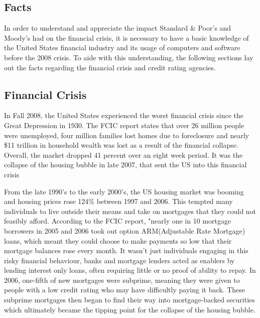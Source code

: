 \documentclass[11pt]{article}
\begin{document}
\newpage



\begin{multicols}{2}
\setcounter{page}{1}
\section{Facts}
In order to understand and appreciate the impact Standard \& Poor's and Moody's had on the financial crisis, it is necessary to have a basic knowledge of the United States financial industry and its usage of computers and software before the 2008 crisis.  To aide with this understanding, the following sections lay out the facts regarding the financial crisis and credit rating agencies.


\subsection{Financial Crisis}
In Fall 2008, the United States experienced the worst financial crisis since the Great Depression in 1930.  The FCIC report states that over 26 million people were unemployed, four million families lost homes due to foreclosure and nearly \$11 trillion in household wealth was lost as a result of the financial collapse.  \cite[p.~xv]{govtReport}  Overall, the market dropped 41 percent over an eight week period. \cite{marketWatch}  It was the collapse of the housing bubble in late 2007, that sent the US into this financial crisis


From the late 1990's to the early 2000's, the US housing market was booming and housing prices rose 124\% between 1997 and 2006. \cite{economistCreditCrunch}  This tempted many individuals to live outside their means and take on mortgages that they could not feasibly afford.  According to the FCIC report, "nearly one in 10 mortgage borrowers in 2005 and 2006 took out option ARM(Adjustable Rate Mortgage) loans, which meant they could choose to make payments so low that their mortgage balances rose every month. \cite[p.~xx]{govtReport} It wasn't just individuals engaging in this risky financial behaviour, banks and mortgage lenders acted as enablers by lending interest only loans, often requiring little or no proof of ability to repay. \cite[p.~xxiii]{govtReport}  In 2006, one-fifth of new mortgages were subprime, meaning they were given to people with a low credit rating who may have difficultly paying it back. \cite{economistCreditCrunch}  These subprime mortgages then began to find their way into mortgage-backed securities which ultimately became the tipping point for the collapse of the housing bubble.



\end{multicols}
\end{document}
